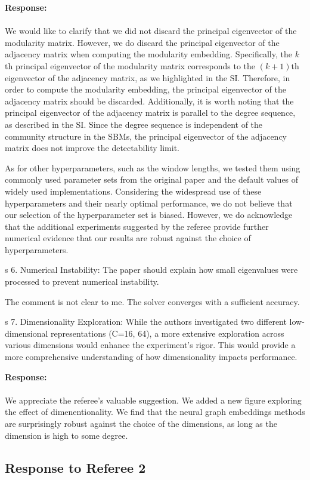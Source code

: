 \documentclass[12pt]{article}
\newcounter{comment}[subsection]
\newcommand{\response}[1]{{\noindent \textbf{Response:} \\ \\ \noindent #1}}
\newcommand{\rcomment}[1]{%
\vspace{10pt}
\begin{sectionbox}
s #1
\end{sectionbox}
}
\begin{document}
\response{
We would like to clarify that we did not discard the principal eigenvector of the modularity matrix. However, we do discard the principal eigenvector of the adjacency matrix when computing the modularity embedding. Specifically, the $k$th principal eigenvector of the modularity matrix corresponds to the $(k+1)$th eigenvector of the adjacency matrix, as we highlighted in the  SI. Therefore, in order to compute the modularity embedding, the principal eigenvector of the adjacency matrix should be discarded. Additionally, it is worth noting that the principal eigenvector of the adjacency matrix is parallel to the degree sequence, as described in the SI. Since the degree sequence is independent of the community structure in the SBMs, the principal eigenvector of the adjacency matrix does not improve the detectability limit.

As for other hyperparameters, such as the window lengths, we tested them using commonly used parameter sets from the original paper and the default values of widely used implementations. Considering the widespread use of these hyperparameters and their nearly optimal performance, we do not believe that our selection of the hyperparameter set is biased. However, we do acknowledge that the additional experiments suggested by the referee provide further numerical evidence that our results are robust against the choice of hyperparameters.
}


\rcomment{
6. Numerical Instability: The paper should explain how small eigenvalues were processed to prevent numerical instability. 
}

The comment is not clear to me. The solver converges with a sufficient accuracy. 

\rcomment{
7. Dimensionality Exploration: While the authors investigated two different low-dimensional representations (C=16, 64), a more extensive exploration across various dimensions would enhance the experiment's rigor. This would provide a more comprehensive understanding of how dimensionality impacts performance.
}


\response{
We appreciate the referee's valuable suggestion. We added a new figure exploring the effect of dimenentionality. We find that the neural graph embeddings methods are surprisingly robust against the choice of the dimensions, as long as the dimension is high to some degree. 
}

\clearpage

\subsection{Response to Referee 2}
\end{document}
